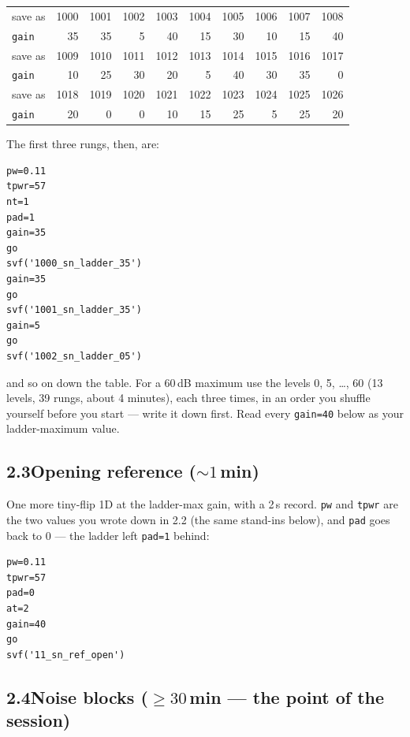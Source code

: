 \documentclass[11pt]{article}
\begin{document}
\begin{center}\small
\begin{tabular}{@{}l*{9}{r}@{}}
\toprule
save as & 1000 & 1001 & 1002 & 1003 & 1004 & 1005 & 1006 & 1007 & 1008\\
\texttt{gain} & 35 & 35 & 5 & 40 & 15 & 30 & 10 & 15 & 40\\
\midrule
save as & 1009 & 1010 & 1011 & 1012 & 1013 & 1014 & 1015 & 1016 & 1017\\
\texttt{gain} & 10 & 25 & 30 & 20 & 5 & 40 & 30 & 35 & 0\\
\midrule
save as & 1018 & 1019 & 1020 & 1021 & 1022 & 1023 & 1024 & 1025 & 1026\\
\texttt{gain} & 20 & 0 & 0 & 10 & 15 & 25 & 5 & 25 & 20\\
\bottomrule
\end{tabular}
\end{center}

The first three rungs, then, are:

\begin{lstlisting}
pw=0.11
tpwr=57
nt=1
pad=1
gain=35
go
svf('1000_sn_ladder_35')
gain=35
go
svf('1001_sn_ladder_35')
gain=5
go
svf('1002_sn_ladder_05')
\end{lstlisting}

and so on down the table. For a 60\,dB maximum use the levels 0, 5,
\ldots, 60 (13 levels, 39 rungs, about 4 minutes), each three times,
in an order you shuffle yourself before you start --- write it down
first. Read every \texttt{gain=40} below as your ladder-maximum value.

\subsection*{2.3\quad Opening reference (${\sim}1$\,min)}

One more tiny-flip 1D at the ladder-max gain, with a 2\,s record.
\texttt{pw} and \texttt{tpwr} are the two values you wrote down in
2.2 (the same stand-ins below), and \texttt{pad} goes back to 0 --- the
ladder left \texttt{pad=1} behind:

\begin{lstlisting}
pw=0.11
tpwr=57
pad=0
at=2
gain=40
go
svf('11_sn_ref_open')
\end{lstlisting}

\subsection*{2.4\quad Noise blocks (${\geq}30$\,min --- the point of the session)}
\end{document}
